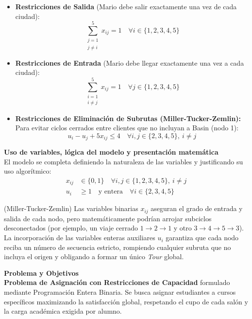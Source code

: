 \documentclass[10pt,a4paper]{article}
\begin{document}
\begin{itemize}
    \item \textbf{Restricciones de Salida} (Mario debe salir exactamente una vez de cada ciudad):
    \[ \sum_{\substack{j=1 \\ j \neq i}}^{5} x_{ij} = 1 \quad \forall i \in \{1, 2, 3, 4, 5\} \]
    
    \item \textbf{Restricciones de Entrada} (Mario debe llegar exactamente una vez a cada ciudad):
    \[ \sum_{\substack{i=1 \\ i \neq j}}^{5} x_{ij} = 1 \quad \forall j \in \{1, 2, 3, 4, 5\} \]
    
    \item \textbf{Restricciones de Eliminación de Subrutas (Miller-Tucker-Zemlin):} \\
    Para evitar ciclos cerrados entre clientes que no incluyan a Basin (nodo 1):
    \[ u_i - u_j + 5x_{ij} \le 4 \quad \forall i, j \in \{2, 3, 4, 5\}, \ i \neq j \]
\end{itemize}

\vspace{3mm}
\textbf{Uso de variables, lógica del modelo y presentación matemática}\\
El modelo se completa definiendo la naturaleza de las variables y justificando su uso algorítmico:
\begin{align*}
    x_{ij} &\in \{0, 1\} \quad \forall i, j \in \{1, 2, 3, 4, 5\}, \ i \neq j \\
    u_i &\ge 1 \quad \text{y entera} \quad \forall i \in \{2, 3, 4, 5\}
\end{align*}

\begin{nota}{(Miller-Tucker-Zemlin)}
Las variables binarias $x_{ij}$ aseguran el grado de entrada y salida de cada nodo, pero matemáticamente podrían arrojar subciclos desconectados (por ejemplo, un viaje cerrado $1 \to 2 \to 1$ y otro $3 \to 4 \to 5 \to 3$). La incorporación de las variables enteras auxiliares $u_i$ garantiza que cada nodo reciba un número de secuencia estricto, rompiendo cualquier subruta que no incluya el origen y obligando a formar un único \textit{Tour} global.
\end{nota}

\newpage


\textbf{Problema y Objetivos}\\
\textbf{Problema de Asignación con Restricciones de Capacidad} 
formulado mediante Programación Entera Binaria. 
Se busca asignar estudiantes a cursos específicos 
maximizando la satisfacción global, 
respetando el cupo de cada salón y la carga académica exigida por alumno.
\end{document}
